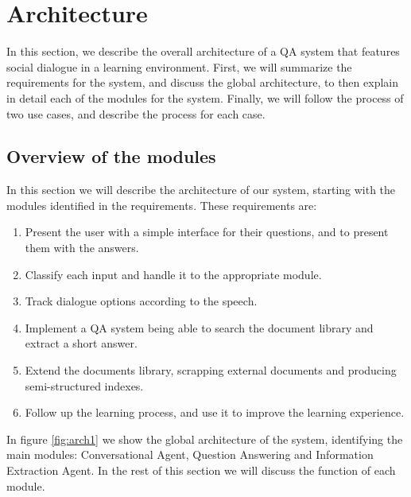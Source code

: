 \chapter{Architecture}
\label{chap:architecture}

\begin{chapterintro}

In this section, we describe the overall architecture of a QA system that features social dialogue in a learning environment. First, we will summarize the requirements for the system, and discuss the global architecture, to then explain in detail each of the modules for the system. Finally, we will follow the process of two use cases, and describe the process for each case.
 
\end{chapterintro}

\cleardoublepage

\section{Overview of the modules}

In this section we will describe the architecture of our system, starting with the modules identified in the requirements. These requirements are:
\begin{enumerate}[noitemsep, label=(\roman*)]
 \item Present the user with a simple interface for their questions, and to present them with the answers.
 \item Classify each input  and handle it to the appropriate module.
 \item Track dialogue options according to the speech.
 \item Implement a QA system being able to search the document library and extract a short answer.
 \item Extend the documents library, scrapping external documents and producing semi-structured indexes.
 \item Follow up the learning process, and use it to improve the learning experience. 
\end{enumerate}

In figure \ref{fig:arch1} we show the global architecture of the system, identifying the main modules: Conversational Agent, Question Answering and Information Extraction Agent. In the rest of this section we will discuss the function of each module.

